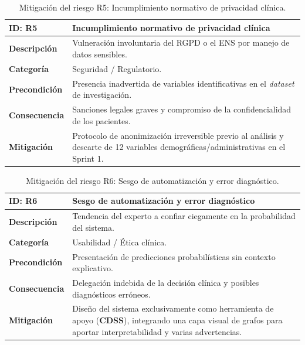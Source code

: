\documentclass[12pt,a4paper,onecolumn,oneside]{report}
\begin{document}
\begin{table}[htbp]
\centering
\small
\begin{tabular}{|p{2.5cm}|p{10.5cm}|}
\hline
\rowcolor[RGB]{230,230,230} \textbf{ID: R5} & \textbf{Incumplimiento normativo de privacidad clínica} \\ \hline
\textbf{Descripción} & Vulneración involuntaria del RGPD \cite{rgpd2016} o el ENS\cite{lopdgdd2018} por manejo de datos sensibles. \\ \hline
\textbf{Categoría} & Seguridad / Regulatorio. \\ \hline
\textbf{Precondición} & Presencia inadvertida de variables identificativas en el \textit{dataset} de investigación. \\ \hline
\textbf{Consecuencia} & Sanciones legales graves y compromiso de la confidencialidad de los pacientes. \\ \hline
\textbf{Mitigación} & Protocolo de anonimización irreversible previo al análisis y descarte de 12 variables demográficas/administrativas en el Sprint 1. \\ \hline
\end{tabular}
\label{tab:R5}
\caption{Mitigación del riesgo R5: Incumplimiento normativo de privacidad clínica.}
\end{table}

\begin{table}[htbp]
\centering
\small
\begin{tabular}{|p{2.5cm}|p{10.5cm}|}
\hline
\rowcolor[RGB]{230,230,230} \textbf{ID: R6} & \textbf{Sesgo de automatización y error diagnóstico} \\ \hline
\textbf{Descripción} & Tendencia del experto a confiar ciegamente en la probabilidad del sistema. \\ \hline
\textbf{Categoría} & Usabilidad / Ética clínica. \\ \hline
\textbf{Precondición} & Presentación de predicciones probabilísticas sin contexto explicativo. \\ \hline
\textbf{Consecuencia} & Delegación indebida de la decisión clínica y posibles diagnósticos erróneos. \\ \hline
\textbf{Mitigación} & Diseño del sistema exclusivamente como herramienta de apoyo (\textbf{CDSS}), integrando una capa visual de grafos para aportar interpretabilidad y varias advertencias. \\ \hline
\end{tabular}
\label{tab:R6}
\caption{Mitigación del riesgo R6: Sesgo de automatización y error diagnóstico.}
\end{table}
\end{document}
